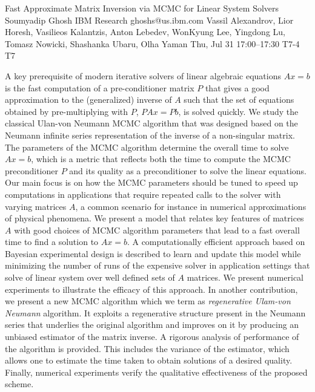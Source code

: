 \begin{talk}
  {Fast Approximate Matrix Inversion via MCMC for Linear System Solvers}%
  {Soumyadip Ghosh}%
  {IBM Research}%
  {ghoshs@us.ibm.com}%
  {Vassil Alexandrov, Lior Horesh, Vasilieos Kalantzis, Anton Lebedev,  WonKyung Lee, Yingdong Lu, Tomasz Nowicki, Shashanka Ubaru, Olha Yaman}%
  {}%
  {Thu, Jul 31 17:00–17:30}%
  {T7-4}%
  {T7}%
  
				
			
A key prerequisite of modern iterative solvers of linear algebraic equations $Ax=b$ is the fast computation of a pre-conditioner matrix $P$ that gives a good approximation to the (generalized) inverse of $A$ such that the set of equations obtained by pre-multiplying with $P$, $PAx=Pb$, is solved quickly. 
We study the classical Ulan-von Neumann MCMC algorithm that was designed based on the Neumann infinite series representation of the inverse of a non-singular matrix. The parameters of the MCMC algorithm determine the overall time to solve $Ax=b$, which is a metric that 
reflects both the time to compute the MCMC preconditioner $P$ and its quality as a preconditioner to solve the linear equations. Our main focus is on how the MCMC parameters should be tuned to speed up computations in applications that require repeated calls to the solver with varying matrices $A$, a common scenario for instance in numerical approximations of physical phenomena. 
We present a model that relates key features of matrices $A$ with good choices of MCMC algorithm parameters that lead to a fast overall time to find a solution to $Ax=b$. A computationally efficient approach based on Bayesian experimental design is described to learn and update this model while minimizing the number of runs of the expensive solver in application settings that solve of linear system over well defined sets of $A$ matrices. We present numerical experiments to illustrate the efficacy of this approach.
In another contribution, we present a new MCMC algorithm which we term as \emph{regenerative Ulam-von Neumann} algorithm. It exploits a regenerative structure present in the Neumann series that underlies the original algorithm and improves on it by producing an unbiased estimator of the matrix inverse. A rigorous analysis of performance of the algorithm is provided. This includes the variance of the estimator, which allows one to estimate the time taken to obtain solutions of a desired quality. Finally, numerical experiments verify the qualitative effectiveness of the proposed scheme. 

\end{talk}

